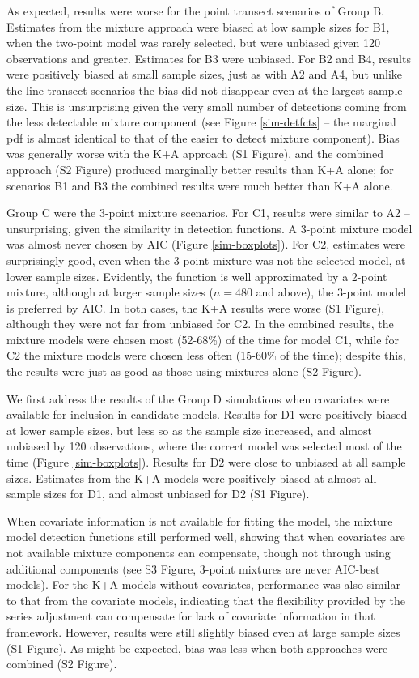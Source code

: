 \documentclass[10pt]{article}
\begin{document}
As expected, results were worse for the point transect scenarios of Group B. Estimates from the mixture approach were biased at low sample sizes for B1, when the two-point model was rarely selected, but were unbiased given 120 observations and greater. Estimates for B3 were unbiased.  For B2 and B4, results were positively biased at small sample sizes, just as with A2 and A4, but unlike the line transect scenarios the bias did not disappear even at the largest sample size. This is unsurprising given the very small number of detections coming from the less detectable mixture component (see Figure \ref{sim-detfcts} -- the marginal pdf is almost identical to that of the easier to detect mixture component). Bias was generally worse with the K+A approach (S1 Figure), and the combined approach (S2 Figure) produced marginally better results than K+A alone; for scenarios B1 and B3 the combined results were much better than K+A alone. 

Group C were the 3-point mixture scenarios.  For C1, results were similar to A2 -- unsurprising, given the similarity in detection functions.  A 3-point mixture model was almost never chosen by AIC (Figure \ref{sim-boxplots}).  For C2, estimates were surprisingly good, even when the 3-point mixture was not the selected model, at lower sample sizes.  Evidently, the function is well approximated by a 2-point mixture, although at larger sample sizes ($n=480$ and above), the 3-point model is preferred by AIC. In both cases, the K+A results were worse (S1 Figure), although they were not far from unbiased for C2.  In the combined results, the mixture models were chosen most (52-68\%) of the time for model C1, while for C2 the mixture models were chosen less often (15-60\% of the time); despite this, the results were just as good as those using mixtures alone (S2 Figure).

We first address the results of the Group D simulations when covariates were available for inclusion in candidate models. Results for D1 were positively biased at lower sample sizes, but less so as the sample size increased, and almost unbiased by 120 observations, where the correct model was selected most of the time (Figure \ref{sim-boxplots}).  Results for D2 were close to unbiased at all sample sizes. Estimates from the K+A models were positively biased at almost all sample sizes for D1, and almost unbiased for D2 (S1 Figure).

When covariate information is not available for fitting the model, the mixture model detection functions still performed well, showing that when covariates are not available mixture components can compensate, though not through using additional components (see S3 Figure, 3-point mixtures are never AIC-best models).  For the K+A models without covariates, performance was also similar to that from the covariate models, indicating that the flexibility provided by the series adjustment can compensate for lack of covariate information in that framework.  However, results were still slightly biased even at large sample sizes (S1 Figure).  As might be expected, bias was less when both approaches were combined (S2 Figure).
\end{document}
